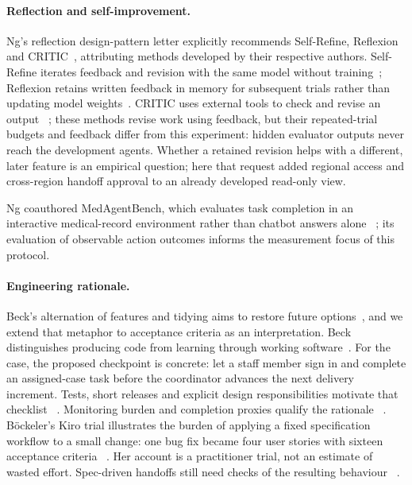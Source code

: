 \paragraph{Reflection and self-improvement.}
Ng's reflection design-pattern letter explicitly recommends Self-Refine,
Reflexion and CRITIC~\cite{ng2024reflection}, attributing methods developed
by their respective authors. Self-Refine iterates feedback and revision with the same model
without training~\cite[Sec.~2]{madaan2023selfrefine}; Reflexion retains
written feedback in memory for subsequent trials rather than updating
model weights~\cite[Sec.~3]{shinn2023reflexion}. CRITIC uses
external tools to check and revise an output
~\cite[Sec.~3]{gou2024critic}; these methods revise work using feedback, but their
repeated-trial budgets and feedback differ from this experiment: hidden
evaluator outputs never reach the development agents. Whether a retained
revision helps with a different, later feature is an empirical question;
here that request added regional access and cross-region handoff
approval to an already developed read-only view.

Ng coauthored MedAgentBench, which evaluates task completion in an
interactive medical-record environment rather than chatbot answers alone
~\cite[arXiv v2, Secs.~2.3--2.4]{jiang2025medagentbench};
its evaluation of observable action outcomes informs the measurement focus
of this protocol.

\paragraph{Engineering rationale.}\label{sec:practitioners}\label{sec:theory}
Beck's alternation of features and tidying aims to restore future
options~\cite{beck2023tidy,beck2025devslow,beck2026prodacity},
and we extend that metaphor to acceptance criteria as an interpretation.
Beck distinguishes producing code from learning
through working software~\cite{beck2026prodacity}.
For the case, the proposed checkpoint is concrete: let a staff member
sign in and complete an assigned-case task before the coordinator advances
the next delivery increment. Tests, short releases and explicit design
responsibilities motivate that checklist
~\cite{beck2002tdd,beck2004xp,
naur1985theory,brooks1987silver,royce1970,gall1975,cockburn2004crystal,
hunt1999pragmatic,agile2001manifesto}.
Monitoring burden and completion proxies qualify the rationale
~\cite{bainbridge1983ironies,simkute2024ironies,tankelevitch2024metacognitive,
lee2025critical,goodhart1975,strathern1997improving,cohen2006review}.
B\"ockeler's Kiro trial illustrates the burden of applying a fixed
specification workflow to a small change: one bug fix became four user
stories with sixteen acceptance criteria
~\cite[One workflow to fit all sizes?]{boeckeler2025sdd}.
Her account is a practitioner trial, not an estimate of wasted effort.
Spec-driven handoffs still need checks of the resulting behaviour
~\cite{delimarsky2025speckit,agarwal2026sdd,waseem2025vibe}.


